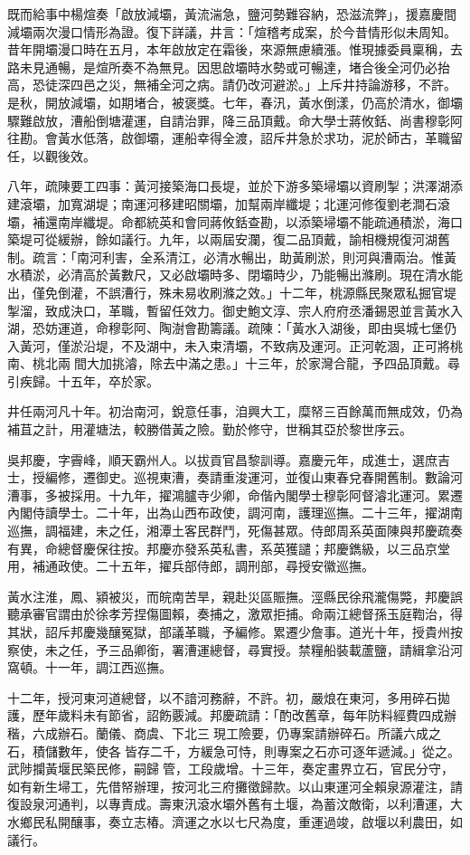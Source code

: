\begin{pinyinscope}
既而給事中楊煊奏「啟放減壩，黃流湍急，鹽河勢難容納，恐滋流弊」，援嘉慶間減壩兩次漫口情形為證。復下詳議，井言：「煊稽考成案，於今昔情形似未周知。昔年開壩漫口時在五月，本年啟放定在霜後，來源無慮續漲。惟現據委員稟稱，去路未見通暢，是煊所奏不為無見。因思啟壩時水勢或可暢達，堵合後全河仍必抬高，恐徒深四邑之災，無補全河之病。請仍改河避淤。」上斥井持論游移，不許。是秋，開放減壩，如期堵合，被褒獎。七年，春汛，黃水倒漾，仍高於清水，御壩驟難啟放，漕船倒塘灌運，自請治罪，降三品頂戴。命大學士蔣攸銛、尚書穆彰阿往勘。會黃水低落，啟御壩，運船幸得全渡，詔斥井急於求功，泥於師古，革職留任，以觀後效。

八年，疏陳要工四事：黃河接築海口長堤，並於下游多築埽壩以資刷掣；洪澤湖添建滾壩，加寬湖堤；南運河移建昭關壩，加幫兩岸纖堤；北運河修復劉老澗石滾壩，補還南岸纖堤。命都統英和會同蔣攸銛查勘，以添築埽壩不能疏通積淤，海口築堤可從緩辦，餘如議行。九年，以兩屆安瀾，復二品頂戴，諭相機規復河湖舊制。疏言：「南河利害，全系清江，必清水暢出，助黃刷淤，則河與漕兩治。惟黃水積淤，必清高於黃數尺，又必啟壩時多、閉壩時少，乃能暢出滌刷。現在清水能出，僅免倒灌，不誤漕行，殊未易收刷滌之效。」十二年，桃源縣民聚眾私掘官堤掣溜，致成決口，革職，暫留任效力。御史鮑文淳、宗人府府丞潘錫恩並言黃水入湖，恐妨運道，命穆彰阿、陶澍會勘籌議。疏陳：「黃水入湖後，即由吳城七堡仍入黃河，僅淤沿堤，不及湖中，未入束清壩，不致病及運河。正河乾涸，正可將桃南、桃北兩間大加挑濬，除去中滿之患。」十三年，於家灣合龍，予四品頂戴。尋引疾歸。十五年，卒於家。

井任兩河凡十年。初治南河，銳意任事，洎興大工，糜帑三百餘萬而無成效，仍為補苴之計，用灌塘法，較勝借黃之險。勤於修守，世稱其亞於黎世序云。

吳邦慶，字霽峰，順天霸州人。以拔貢官昌黎訓導。嘉慶元年，成進士，選庶吉士，授編修，遷御史。巡視東漕，奏請重浚運河，並復山東春兌春開舊制。數論河漕事，多被採用。十九年，擢鴻臚寺少卿，命偕內閣學士穆彰阿督濬北運河。累遷內閣侍讀學士。二十年，出為山西布政使，調河南，護理巡撫。二十三年，擢湖南巡撫，調福建，未之任，湘潭土客民群鬥，死傷甚眾。侍郎周系英面陳與邦慶疏奏有異，命總督慶保往按。邦慶亦發系英私書，系英獲譴；邦慶鐫級，以三品京堂用，補通政使。二十五年，擢兵部侍郎，調刑部，尋授安徽巡撫。

黃水注淮，鳳、潁被災，而皖南苦旱，親赴災區賑撫。涇縣民徐飛瀧傷斃，邦慶誤聽承審官謂由於徐孝芳捏傷圖賴，奏捕之，激眾拒捕。命兩江總督孫玉庭鞫治，得其狀，詔斥邦慶幾釀冤獄，部議革職，予編修。累遷少詹事。道光十年，授貴州按察使，未之任，予三品卿銜，署漕運總督，尋實授。禁糧船裝載蘆鹽，請緝拿沿河窩頓。十一年，調江西巡撫。

十二年，授河東河道總督，以不諳河務辭，不許。初，嚴烺在東河，多用碎石拋護，歷年歲料未有節省，詔飭覈減。邦慶疏請：「酌改舊章，每年防料經費四成辦稭，六成辦石。蘭儀、商虞、下北三現工險要，仍專案請辦碎石。所議六成之石，積儲數年，使各皆存二千，方緩急可恃，則專案之石亦可逐年遞減。」從之。武陟攔黃堰民築民修，嗣歸管，工段歲增。十三年，奏定畫界立石，官民分守，如有新生埽工，先借帑辦理，按河北三府攤徵歸款。以山東運河全賴泉源灌注，請復設泉河通判，以專責成。壽東汛滾水壩外舊有土堰，為蓄汶敵衛，以利漕運，大水鄉民私開釀事，奏立志椿。濟運之水以七尺為度，重運過竣，啟堰以利農田，如議行。


\end{pinyinscope}
